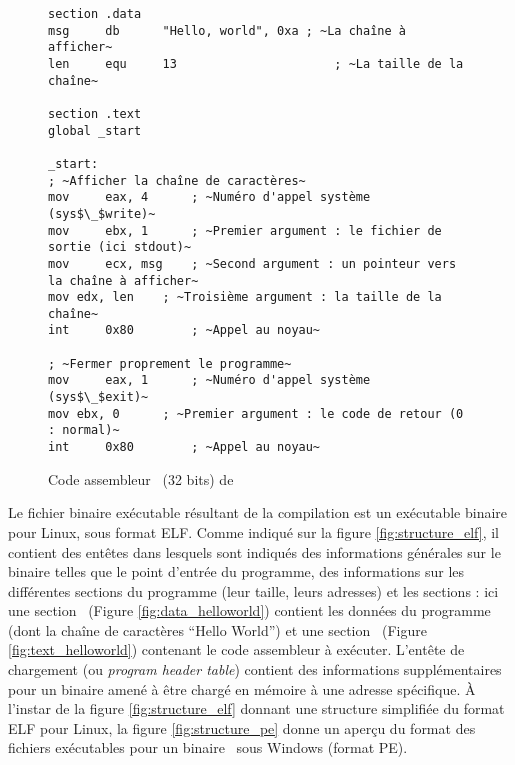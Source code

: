 \begin{figure}
\begin{lstlisting}[language={[x86masm]Assembler}, escapechar=~]
section .data
msg     db      "Hello, world", 0xa	; ~La chaîne à afficher~
len     equ     13                      ; ~La taille de la chaîne~

section .text
global _start

_start:
; ~Afficher la chaîne de caractères~
mov     eax, 4      ; ~Numéro d'appel système (sys$\_$write)~
mov     ebx, 1      ; ~Premier argument : le fichier de sortie (ici stdout)~
mov     ecx, msg    ; ~Second argument : un pointeur vers la chaîne à afficher~
mov	edx, len    ; ~Troisième argument : la taille de la chaîne~
int     0x80        ; ~Appel au noyau~

; ~Fermer proprement le programme~
mov     eax, 1      ; ~Numéro d'appel système (sys$\_$exit)~
mov	ebx, 0	    ; ~Premier argument : le code de retour (0 : normal)~
int     0x80	    ; ~Appel au noyau~
\end{lstlisting}
\caption{Code assembleur \xq\ (32 bits) de \helloworld}
\label{fig:helloword_asm}
\end{figure}

Le fichier binaire exécutable résultant de la compilation est un exécutable binaire pour Linux, sous format ELF.
Comme indiqué sur la figure \ref{fig:structure_elf}, il contient des entêtes dans lesquels sont indiqués des informations générales sur le binaire telles que le point d'entrée du programme, des informations sur les différentes sections du programme (leur taille, leurs adresses) et les sections : ici une section \pdata\ (Figure \ref{fig:data_helloworld}) contient les données du programme (dont la chaîne de caractères ``Hello World'') et une section \ptext\ (Figure \ref{fig:text_helloworld}) contenant le code assembleur à exécuter. L'entête de chargement (ou \emph{program header table}) contient des informations supplémentaires pour un binaire amené à être chargé en mémoire à une adresse spécifique.
À l'instar de la figure \ref{fig:structure_elf} donnant une structure simplifiée du format ELF pour Linux, la figure \ref{fig:structure_pe} donne un aperçu du format des fichiers exécutables pour un binaire \xq\ sous Windows (format PE).


